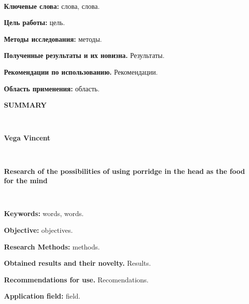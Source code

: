 ~

\vspace{-10pt}
\textbf{Ключевые слова:}
слова, слова.


\textbf{Цель работы:}
цель.

\textbf{Методы исследования:}
методы.

\textbf{Полученные результаты и их новизна.}
Результаты.

\textbf {Рекомендации по использованию.}
Рекомендации.

\textbf{Область применения:}
область.


\newpage
\pagestyle{empty}
\begin{center}
\textbf{SUMMARY}
\end{center}

~

\vspace{-10pt}
\begin{center}
\textbf{Vega Vincent}
\end{center}

~

\vspace{-10pt}
\begin{center}
\textbf{Research of the possibilities of using porridge in the head as the food for the mind}
\end{center}

~

\vspace{-10pt}
\textbf{Keywords:}
words, words.


\textbf{Objective:}
objectives.

\textbf{Research Methods:}
methods.

\textbf{Obtained results and their novelty.}
Results.

\textbf {Recommendations for use.}
Recomendations.

\textbf{Application field:}
field.
